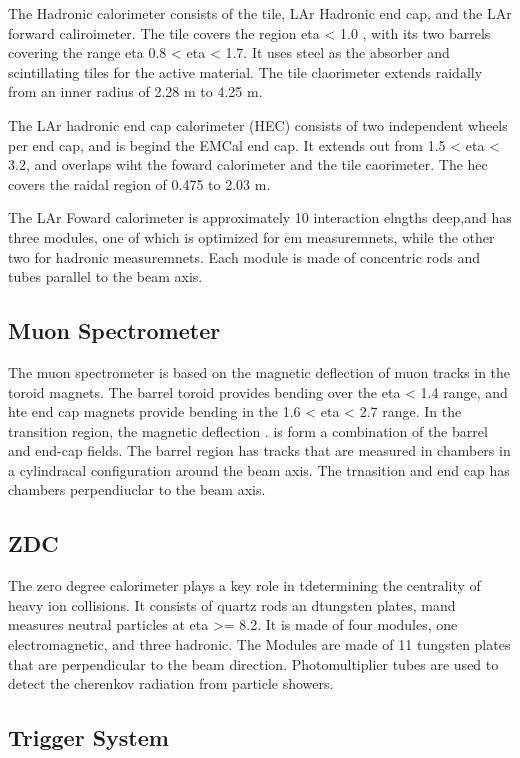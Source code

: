 The Hadronic calorimeter consists of the tile, LAr Hadronic end cap, and the LAr forward caliroimeter. The tile covers the region eta < 1.0 , with its two barrels covering the range eta 0.8 < eta < 1.7. It uses steel as the absorber and scintillating tiles for the active material. The tile claorimeter extends raidally from an inner radius of 2.28 m to 4.25 m. 

The LAr hadronic end cap calorimeter (HEC) consists of two independent wheels per end cap, and is begind the EMCal end cap. It extends out from 1.5 < eta < 3.2, and overlaps wiht the foward calorimeter and the tile caorimeter. The hec covers the raidal region of 0.475 to 2.03 m. 

The LAr Foward calorimeter is approximately 10 interaction elngths deep,and has three modules, one of which is optimized for em measuremnets, while the other two for hadronic measuremnets. Each module is made of concentric rods and tubes parallel to the beam axis. 


\subsection{Muon Spectrometer}
The muon spectrometer is based on the magnetic deflection of muon tracks in the toroid magnets. The barrel toroid provides bending over the eta < 1.4 range, and hte end cap magnets provide bending in the 1.6 < eta < 2.7 range. In the transition region, the magnetic deflection .  is form a combination of the barrel and end-cap fields. The barrel region has tracks that are measured in chambers in a cylindracal configuration around the beam axis. The trnasition and end cap has chambers perpendiuclar to the beam axis. 

\subsection{ZDC}
The zero degree calorimeter plays a key role in tdetermining the centrality of heavy ion collisions. It consists of quartz rods an dtungsten plates, mand measures neutral particles at eta >= 8.2. It is made of four modules, one electromagnetic, and three hadronic. The Modules are made of 11 tungsten plates that are perpendicular to the beam direction. Photomultiplier tubes are used to detect the cherenkov radiation from particle showers.
\subsection{Trigger System}

